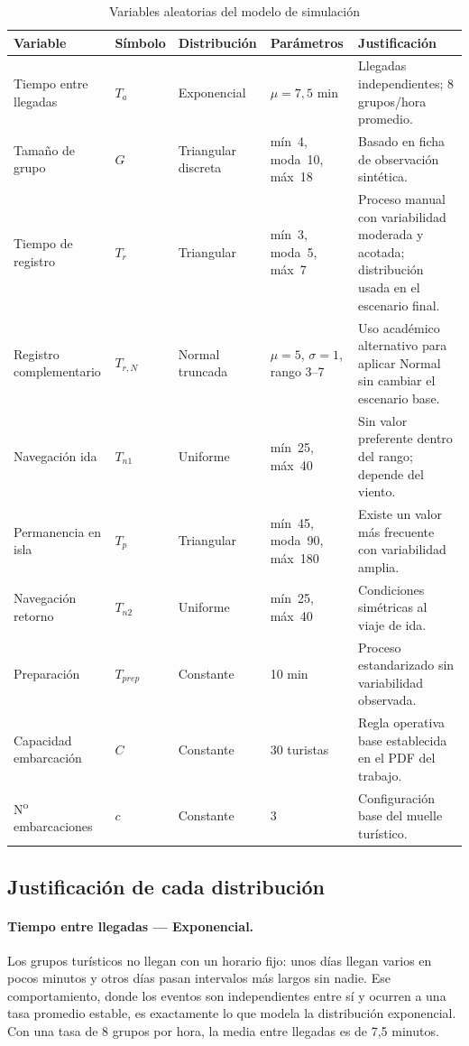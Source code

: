 \documentclass[12pt,a4paper]{article}
\begin{document}
\begin{table}[H]
  \centering
  \caption{Variables aleatorias del modelo de simulación}
  \small
  \begin{tabularx}{\textwidth}{@{} p{3.4cm} p{1.2cm} p{2.8cm} p{3.2cm} X @{}}
    \toprule
    Variable & Símbolo & Distribución & Parámetros & Justificación \\
    \midrule
    Tiempo entre llegadas & $T_a$ & Exponencial & $\mu = 7{,}5$ min &
      Llegadas independientes; 8 grupos/hora promedio. \\[3pt]
    Tamaño de grupo & $G$ & Triangular discreta & mín~4, moda~10, máx~18 &
      Basado en ficha de observación sintética. \\[3pt]
    Tiempo de registro & $T_r$ & Triangular & mín~3, moda~5, máx~7 &
      Proceso manual con variabilidad moderada y acotada; distribución usada en el escenario final. \\[3pt]
    Registro complementario & $T_{r,N}$ & Normal truncada & $\mu=5$, $\sigma=1$, rango 3--7 &
      Uso académico alternativo para aplicar Normal sin cambiar el escenario base. \\[3pt]
    Navegación ida & $T_{n1}$ & Uniforme & mín~25, máx~40 &
      Sin valor preferente dentro del rango; depende del viento. \\[3pt]
    Permanencia en isla & $T_p$ & Triangular & mín~45, moda~90, máx~180 &
      Existe un valor más frecuente con variabilidad amplia. \\[3pt]
    Navegación retorno & $T_{n2}$ & Uniforme & mín~25, máx~40 &
      Condiciones simétricas al viaje de ida. \\[3pt]
    Preparación & $T_{prep}$ & Constante & 10 min &
      Proceso estandarizado sin variabilidad observada. \\[3pt]
    Capacidad embarcación & $C$ & Constante & 30 turistas &
      Regla operativa base establecida en el PDF del trabajo. \\[3pt]
    N\textsuperscript{o} embarcaciones & $c$ & Constante & 3 &
      Configuración base del muelle turístico. \\
    \bottomrule
  \end{tabularx}
\end{table}

\subsection{Justificación de cada distribución}

\paragraph{Tiempo entre llegadas — Exponencial.}
Los grupos turísticos no llegan con un horario fijo: unos días llegan
varios en pocos minutos y otros días pasan intervalos más largos sin
nadie. Ese comportamiento, donde los eventos son independientes entre sí
y ocurren a una tasa promedio estable, es exactamente lo que modela la
distribución exponencial. Con una tasa de 8 grupos por hora, la media
entre llegadas es de 7,5 minutos.
\end{document}
